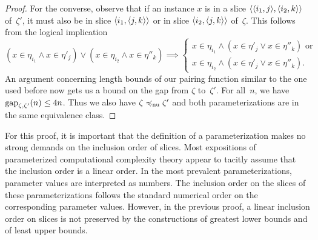 \begin{proof}
  For the converse, observe that if an instance $x$ is in a slice ${\langle {\langle i_1, j\rangle}, {\langle i_2, k\rangle}\rangle}$ of~$\zeta'$, it must also be in slice ${\langle i_1, {\langle j, k\rangle}\rangle}$ or in slice ${\langle i_2, {\langle j, k\rangle}\rangle}$ of~$\zeta$.
  This follows from the logical implication
  \begin{equation*}
    (x \in \eta_{i_1} \land x \in \eta'_j) \lor (x \in \eta_{i_2} \land x \in \eta''_k) \implies \begin{cases}
      x \in \eta_{i_1} \land (x \in \eta'_j \lor x \in \eta''_k)\text{ or} \\
      x \in \eta_{i_2} \land (x \in \eta'_j \lor x \in \eta''_k).
    \end{cases}
  \end{equation*}
  An argument concerning length bounds of our pairing function similar to the one used before now gets us a bound on the gap from $\zeta$ to~$\zeta'$.
  For all~$n$, we have $\operatorname{gap}_{\zeta, \zeta'}(n) \le 4n$.
  Thus we also have $\zeta \preccurlyeq_\mathrm{nu} \zeta'$ and both parameterizations are in the same equivalence class.
\end{proof}

For this proof, it is important that the definition of a parameterization makes no strong demands on the inclusion order of slices.
Most expositions of parameterized computational complexity theory appear to tacitly assume that the inclusion order is a linear order.
In the most prevalent parameterizations, parameter values are interpreted as numbers.
The inclusion order on the slices of these parameterizations follows the standard numerical order on the corresponding parameter values.
However, in the previous proof, a linear inclusion order on slices is not preserved by the constructions of greatest lower bounds and of least upper bounds.

